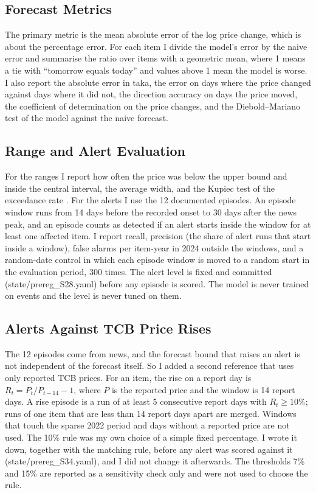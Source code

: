 \subsection{Forecast Metrics}
The primary metric is the mean absolute error of the log price change, which is about the percentage error. For each item I divide the model's error by the naive error and summarise the ratio over items with a geometric mean, where 1 means a tie with ``tomorrow equals today'' and values above 1 mean the model is worse. I also report the absolute error in taka, the error on days where the price changed against days where it did not, the direction accuracy on days the price moved, the coefficient of determination on the price changes, and the Diebold--Mariano test of the model against the naive forecast.

\subsection{Range and Alert Evaluation}
For the ranges I report how often the price was below the upper bound and inside the central interval, the average width, and the Kupiec test of the exceedance rate \cite{kupiec}. For the alerts I use the 12 documented episodes. An episode window runs from 14 days before the recorded onset to 30 days after the news peak, and an episode counts as detected if an alert starts inside the window for at least one affected item. I report recall, precision (the share of alert runs that start inside a window), false alarms per item-year in 2024 outside the windows, and a random-date control in which each episode window is moved to a random start in the evaluation period, 300 times. The alert level is fixed and committed (state/prereg\_S28.yaml) before any episode is scored. The model is never trained on events and the level is never tuned on them.

\subsection{Alerts Against TCB Price Rises}\label{sec:riserule}
The 12 episodes come from news, and the forecast bound that raises an alert is not independent of the forecast itself. So I added a second reference that uses only reported TCB prices. For an item, the rise on a report day is $R_t = P_t / P_{t-14} - 1$, where $P$ is the reported price and the window is 14 report days. A rise episode is a run of at least 5 consecutive report days with $R_t \ge 10\%$; runs of one item that are less than 14 report days apart are merged. Windows that touch the sparse 2022 period and days without a reported price are not used. The 10\% rule was my own choice of a simple fixed percentage. I wrote it down, together with the matching rule, before any alert was scored against it (state/prereg\_S34.yaml), and I did not change it afterwards. The thresholds 7\% and 15\% are reported as a sensitivity check only and were not used to choose the rule.

